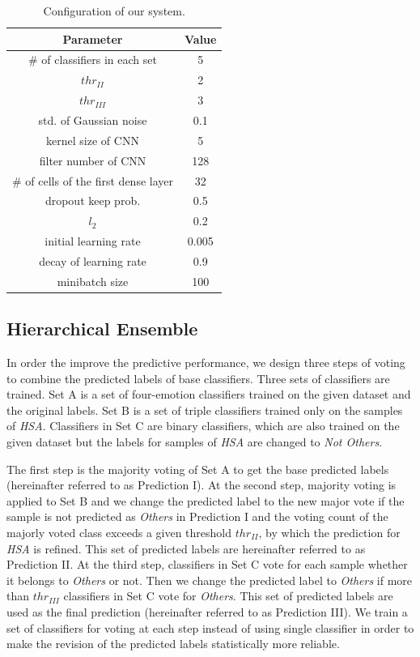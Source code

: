 \documentclass[11pt,a4paper]{article}
\begin{document}
\begin{table}\small
\begin{center}
\begin{tabular}{c|c}
\hline
\bf Parameter & \bf Value \\ 
\hline
\# of classifiers in each set  & 5 \\
$thr_{II}$ & 2  \\
$thr_{III}$ & 3 \\
\hline
std. of Gaussian noise & 0.1 \\
kernel size of CNN  & 5 \\
filter number of CNN & 128 \\
\# of cells of the first dense layer & 32 \\
dropout keep prob. & 0.5 \\
\em $l_2$ & 0.2 \\
initial learning rate & 0.005 \\
decay of learning rate & 0.9 \\
minibatch size & 100 \\
\hline
\end{tabular}
\end{center}
\caption{\label{tab:hyper_param} Configuration of our system.}
\end{table}

\subsection{Hierarchical Ensemble}
\label{ssec:ensemble}

In order the improve the predictive performance, we design three steps of voting to combine the predicted labels of base classifiers. Three sets of classifiers are trained. Set A is a set of four-emotion classifiers trained on the given dataset and the original labels. Set B is a set of triple classifiers trained only on the samples of {\em HSA}. Classifiers in Set C are binary classifiers, which are also trained on the given dataset but the labels for samples of {\em HSA} are changed to {\em Not Others}. 

The first step is the majority voting of Set A to get the base predicted labels (hereinafter referred to as Prediction I). At the second step, majority voting is applied to Set B and we change the predicted label to the new major vote if the sample is not predicted as {\em Others} in Prediction I and the voting count of the majorly voted class exceeds a given threshold $thr_{II}$, by which the prediction for {\em HSA} is refined. This set of predicted labels are hereinafter referred to as Prediction II. At the third step, classifiers in Set C vote for each sample whether it belongs to {\em Others} or not. Then we change the predicted label to {\em Others} if more than $thr_{III}$ classifiers in Set C vote for {\em Others}. This set of predicted labels are used as the final prediction (hereinafter referred to as Prediction III). We train a set of classifiers for voting at each step instead of using single classifier in order to make the revision of the predicted labels statistically more reliable.
\end{document}
